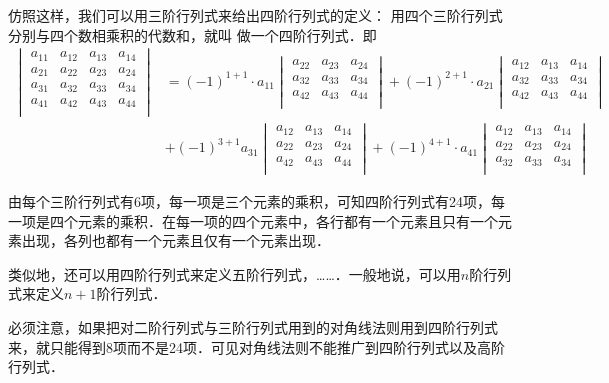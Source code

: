 仿照这样，我们可以用三阶行列式来给出四阶行列式的定义：
用四个三阶行列式分别与四个数相乘积的代数和，就叫
做一个四阶行列式．即
\[\begin{split}
    \begin{vmatrix}
       a_{11}&a_{12}&a_{13}&a_{14}\\
    a_{21}&a_{22}&a_{23}&a_{24}\\
    a_{31}&a_{32}&a_{33}&a_{34}\\
    a_{41}&a_{42}&a_{43}&a_{44}\\
    \end{vmatrix}&=(-1)^{1+1}\cdot a_{11}\begin{vmatrix}
        a_{22}&a_{23}&a_{24}\\
        a_{32}&a_{33}&a_{34}\\
        a_{42}&a_{43}&a_{44}\\
    \end{vmatrix}+(-1)^{2+1}\cdot a_{21}\begin{vmatrix}
        a_{12}&a_{13}&a_{14}\\
        a_{32}&a_{33}&a_{34}\\
        a_{42}&a_{43}&a_{44}\\
    \end{vmatrix}\\
    & +(-1)^{3+1}a_{31}\begin{vmatrix}
        a_{12}&a_{13}&a_{14}\\
        a_{22}&a_{23}&a_{24}\\
        a_{42}&a_{43}&a_{44}\\
    \end{vmatrix}
    +(-1)^{4+1}\cdot a_{41}\begin{vmatrix}
        a_{12}&a_{13}&a_{14}\\
        a_{22}&a_{23}&a_{24}\\
        a_{32}&a_{33}&a_{34}\\
    \end{vmatrix}
    \end{split}\]

由每个三阶行列式有6项，每一项是三个元素的乘积，可知四阶行列式有24项，每一项是四个元素的乘积．在每一项的四个元素中，各行都有一个元素且只有一个元素出现，各列也都有一个元素且仅有一个元素出现．

类似地，还可以用四阶行列式来定义五阶行列式，……．一般地说，可以用$n$阶行列式来定义$n+1$阶行列式．

必须注意，如果把对二阶行列式与三阶行列式用到的对角线法则用到四阶行列式来，就只能得到8项而不是24项．可见对角线法则不能推广到四阶行列式以及高阶行列式．

